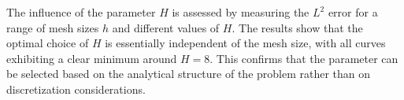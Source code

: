 \documentclass{article}
\begin{document}








The influence of the parameter $H$ is assessed by measuring the $L^2$ error
for a range of mesh sizes $h$ and different values of $H$. The results show
that the optimal choice of $H$ is essentially independent of the mesh size,
with all curves exhibiting a clear minimum around $H = 8$. This confirms that
the parameter can be selected based on the analytical structure of the problem
rather than on discretization considerations.
\end{document}
